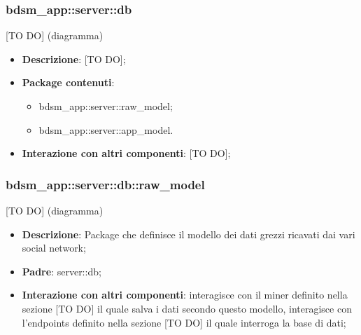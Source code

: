 

\subsubsection{bdsm\_app::server::db} %
\label{ssub:bdsm_app_server_db}
[TO DO] (diagramma) \newline \newline

\begin{itemize}
  \item \textbf{Descrizione}: [TO DO];
  \item \textbf{Package contenuti}:
    \begin{itemize}
      \item bdsm\_app::server::raw\_model;
      \item bdsm\_app::server::app\_model.
    \end{itemize}
  \item \textbf{Interazione con altri componenti}: [TO DO];
\end{itemize}



  \subsubsection{bdsm\_app::server::db::raw\_model} %
  \label{ssub:bdsm_app_server_raw_model}
  [TO DO] (diagramma) \newline \newline

  \begin{itemize}
  \item \textbf{Descrizione}: Package che definisce il modello dei dati grezzi ricavati dai vari social network;
  \item \textbf{Padre}: server::db;
  \item \textbf{Interazione con altri componenti}: interagisce con il miner definito nella sezione [TO DO] il quale salva i dati secondo questo modello, interagisce con l'endpoints definito nella sezione [TO DO] il quale interroga la base di dati;
  \end{itemize}

